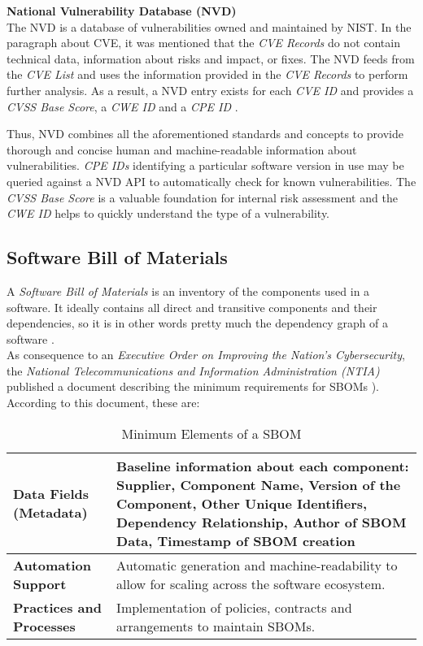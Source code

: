 \noindent
\textbf{National Vulnerability Database (NVD)}\\
\noindent
The NVD is a database of vulnerabilities owned and maintained by NIST. In the paragraph about CVE, it was mentioned that the \textit{CVE Records} do not contain technical data, information about risks and impact, or fixes. The NVD feeds from the \textit{CVE List} and uses the information provided in the \textit{CVE Records} to perform further analysis. As a result, a NVD entry exists for each \textit{CVE ID} and provides a \textit{CVSS Base Score}, a \textit{CWE ID} and a \textit{CPE ID} \cite{NVDWebsite}.\par 
Thus, NVD combines all the aforementioned standards and concepts to provide thorough and concise human and machine-readable information about vulnerabilities. \textit{CPE IDs} identifying a particular software version in use may be queried against a NVD API to automatically check for known vulnerabilities. The \textit{CVSS Base Score} is a valuable foundation for internal risk assessment and the \textit{CWE ID} helps to quickly understand the type of a vulnerability.\\

\subsection{Software Bill of Materials} \label{sec:SBOM}
A \textit{Software Bill of Materials} is an inventory of the components used in a software. It ideally contains all direct and transitive components and their dependencies, so it is in other words pretty much the dependency graph of a software \cite{OWASPWebsite,NTIASBOM}.\\

As consequence to an \textit{Executive Order on Improving the Nation's Cybersecurity}, the \textit{National Telecommunications and Information Administration (NTIA)} published a document describing the minimum requirements for SBOMs \cite{ExecutiveOrderSBOM,NTIASBOM}). According to this document, these are:

\begin{table}[H]
	\begin{tabularx}{\linewidth}{|l|X|}
		\hline
		\textbf{Data Fields (Metadata)} & Baseline information about each component: Supplier, Component Name, Version of the Component, Other Unique Identifiers, Dependency Relationship, Author of SBOM Data, Timestamp of SBOM creation \\
		\hline
		\textbf{Automation Support} & Automatic generation and machine-readability to allow for scaling across the software ecosystem. \\
		\hline
		\textbf{Practices and Processes} & Implementation of policies, contracts and arrangements to maintain SBOMs.\\
		\hline
	\end{tabularx}
	\caption[Minimum Elements of a SBOM]{Minimum Elements of a SBOM }
	\label{Tab:ElementsOfSBOM}
\end{table}

